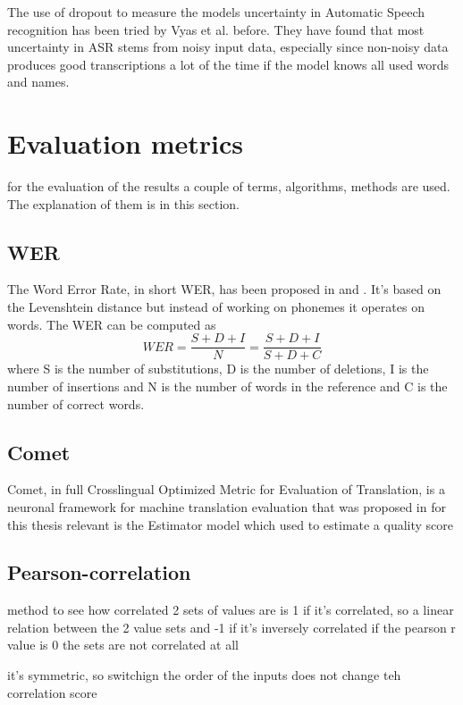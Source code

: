 The use of dropout to measure the models uncertainty in Automatic Speech recognition has been tried by Vyas et al. \cite{8683086} before.
They have found that most uncertainty in ASR stems from noisy input data, especially since non-noisy data produces good transcriptions a lot of the time if the model knows all used words and names. 

\section{Evaluation metrics}
 for the evaluation of the results a couple of terms, algorithms, methods are used. The explanation of them is in this section. 
 
\subsection{WER}
\label{wer}
The Word Error Rate, in short WER, has been proposed in \cite{woodard1982} and \cite{morris2004}.
It's based on the Levenshtein distance but instead of working on phonemes it operates on words.
The WER can be computed as $$WER=\frac{S+D+I}{N}=\frac{S+D+I}{S+D+C}$$ where S is the number of substitutions, D is the number of deletions, I is the number of insertions and N is the number of words in the reference and C is the number of correct words.

\subsection{Comet}
Comet, in full Crosslingual Optimized Metric for Evaluation of Translation, is a neuronal framework for machine translation evaluation that was proposed in \cite{rei-etal-2020-comet} 
for this thesis relevant is the Estimator model which used to estimate a quality score 

\subsection{Pearson-correlation}
method to see how correlated 2 sets of values are
is 1 if it's correlated, so a linear relation between the 2 value sets and -1 if it's inversely correlated 
if the pearson r value is 0 the sets are not correlated at all

it's symmetric, so switchign the order of the inputs does not change teh correlation score

